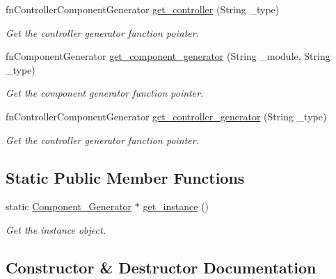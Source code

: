 \begin{DoxyCompactItemize}
\item 
fn\+Controller\+Component\+Generator \mbox{\hyperlink{classbanita_1_1_component___generator_a607e2c3ac5e7f0b8d419e610d419f3a6}{get\+\_\+controller}} (String \+\_\+type)
\begin{DoxyCompactList}\small\item\em Get the controller generator function pointer. \end{DoxyCompactList}\item 
fn\+Component\+Generator \mbox{\hyperlink{classbanita_1_1_component___generator_ad8a76cb6dfb2b8667d412b0b014ca75d}{get\+\_\+component\+\_\+generator}} (String \+\_\+module, String \+\_\+type)
\begin{DoxyCompactList}\small\item\em Get the component generator function pointer. \end{DoxyCompactList}\item 
fn\+Controller\+Component\+Generator \mbox{\hyperlink{classbanita_1_1_component___generator_a026cadc610c5c75a911ed1299047190a}{get\+\_\+controller\+\_\+generator}} (String \+\_\+type)
\begin{DoxyCompactList}\small\item\em Get the controller generator function pointer. \end{DoxyCompactList}\end{DoxyCompactItemize}
\subsection*{Static Public Member Functions}
\begin{DoxyCompactItemize}
\item 
static \mbox{\hyperlink{classbanita_1_1_component___generator}{Component\+\_\+\+Generator}} $\ast$ \mbox{\hyperlink{classbanita_1_1_component___generator_a58161267b33b3a6e67edfed079196ebd}{get\+\_\+instance}} ()
\begin{DoxyCompactList}\small\item\em Get the instance object. \end{DoxyCompactList}\end{DoxyCompactItemize}


\subsection{Constructor \& Destructor Documentation}
\mbox{\label{classbanita_1_1_component___generator_a2eeb40bd9675d0c1828de601324c503d}} 
